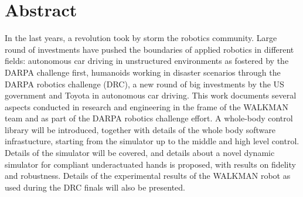 %
\chapter*{Abstract}
\label{sec:abstract}
\vspace*{-10mm}
In the last years, a revolution took by  storm the robotics community. Large round of investments have pushed the boundaries of applied robotics in different fields: autonomous car driving in unstructured environments as fostered by the DARPA challenge first, humanoids working in disaster scenarios through the DARPA robotics challenge (DRC), a new round of big investments by the US government and Toyota in autonomous car driving. This work documents several aspects conducted in research and engineering in the frame of the WALKMAN team and as part of the DARPA robotics challenge effort. A whole-body control library will be introduced, together with details of the whole body software infrastucture, starting from the simulator up to the middle and high level control. Details of the simulator will be covered, and details about a novel dynamic simulator for compliant underactuated hands is proposed, with results on fidelity and robustness. Details of the experimental results of the WALKMAN robot as used during the DRC finals will also be presented.

\vspace*{20mm}


